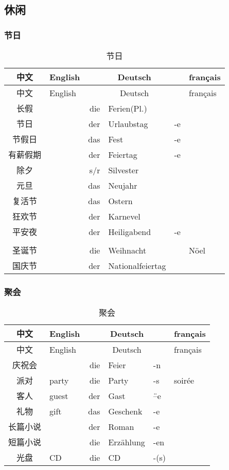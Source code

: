 \documentclass[12pt,A4paper,oneside,reqno]{amsart}
\numberwithin{equation}{section}
\theoremstyle{plain}
\theoremstyle{plain}
\theoremstyle{plain}
\numberwithin{equation}{section}
\theoremstyle{remark}
\begin{document}
\subsection{休闲}\hspace{1cm}
\subsubsection{节日}\hspace{1cm}
\begin{longtable}{c|l|rll|l}
	\hline
	中文	&	English	&\multicolumn{3}{c|}{Deutsch} &	français  	\\
	\hline
	\endhead
	\hline
	中文	&	English	&\multicolumn{3}{c|}{Deutsch} &	français  	\\
	\hline
	\endfirsthead	
	\hline
	\endfoot
	\hline	
	\caption{节日}
	\endlastfoot				
长假	&	&	die	&	Ferien(Pl.)	&		&		\\
节日	&	&	der	&	Urlaubstag	&	-e	&		\\
节假日	&	&	das	&	Fest	&	-e	&		\\
有薪假期	&	&	der	&	Feiertag	&	-e	&		\\
\hline										
除夕	&	&	s/r	&	Silvester	&		&		\\
元旦	&	&	das	&	Neujahr	&		&		\\
复活节	&	&	das	&	Ostern	&		&		\\
狂欢节	&	&	der	&	Karnevel	&		&		\\
平安夜	&	&	der	&	Heiligabend	&	-e	&		\\
&	&		&		&		&		\\
圣诞节	&	&	die	&	Weihnacht	&		&	N\"{o}el	\\
国庆节	&	&	der	&	Nationalfeiertag	&		&		\\



	
	
\end{longtable}
\subsubsection{聚会}\hspace{1cm}
\begin{longtable}{c|l|rll|l}
	\hline
	中文	&	English	&\multicolumn{3}{c|}{Deutsch} &	français  	\\
	\hline
	\endhead
	\hline
	中文	&	English	&\multicolumn{3}{c|}{Deutsch} &	français  	\\
	\hline
	\endfirsthead	
	\hline
	\endfoot
	\hline	
	\caption{聚会}
	\endlastfoot				
庆祝会	&		&	die	&	Feier	&	-n	&		\\
派对	&	party	&	die	&	Party	&	-s	&	soir\'{e}e	\\
客人	&	guest	&	der	&	Gast	&	\"{--}e	&		\\
礼物	&	gift	&	das	&	Geschenk	&	-e	&		\\
长篇小说	&		&	der	&	Roman	&	-e	&		\\
短篇小说	&		&	die	&	Erz\"{a}hlung	&	-en	&		\\
光盘	&	CD	&	die	&	CD	&	-(s)	&		\\

	
\end{longtable}
\end{document}
